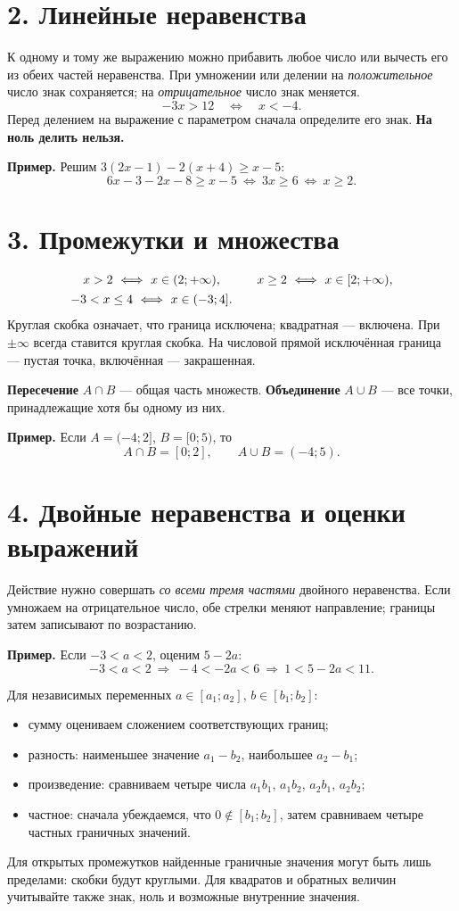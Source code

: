 \documentclass[a4paper,12pt]{article}
\newcommand{\chap}[1]{\needspace{7\baselineskip}\section*{\color{darkaccent}#1}}
\newcommand{\ex}[1]{\par\smallskip\textcolor{darkaccent}{\textbf{Пример.}} #1\par}
\newcommand{\key}[1]{\textcolor{darkaccent}{\textbf{#1}}}
\begin{document}
\chap{2. Линейные неравенства}
К одному и тому же выражению можно прибавить любое число или вычесть его из обеих частей неравенства. При умножении или делении на \emph{положительное} число знак сохраняется; на \emph{отрицательное} число знак меняется.
\[
-3x>12\quad\Longleftrightarrow\quad x<-4.
\]
Перед делением на выражение с параметром сначала определите его знак. \key{На ноль делить нельзя.}

\ex{Решим $3(2x-1)-2(x+4)\ge x-5$:
\[
6x-3-2x-8\ge x-5\ \Longleftrightarrow\ 3x\ge6
\ \Longleftrightarrow\ x\ge2.
\]}

\chap{3. Промежутки и множества}
\[
\begin{array}{c@{\qquad}c}
x>2\ \Longleftrightarrow\ x\in(2;+\infty), &
x\ge2\ \Longleftrightarrow\ x\in[2;+\infty),\\[4pt]
-3<x\le4\ \Longleftrightarrow\ x\in(-3;4]. &
\end{array}
\]
Круглая скобка означает, что граница исключена; квадратная --- включена. При $\pm\infty$ всегда ставится круглая скобка. На числовой прямой исключённая граница --- пустая точка, включённая --- закрашенная.

\key{Пересечение} $A\cap B$ --- общая часть множеств. \key{Объединение} $A\cup B$ --- все точки, принадлежащие хотя бы одному из них.

\ex{Если $A=(-4;2]$, $B=[0;5)$, то
\[
A\cap B=[0;2],\qquad A\cup B=(-4;5).
\]}
\clearpage

\chap{4. Двойные неравенства и оценки выражений}
Действие нужно совершать \emph{со всеми тремя частями} двойного неравенства. Если умножаем на отрицательное число, обе стрелки меняют направление; границы затем записывают по возрастанию.

\ex{Если $-3<a<2$, оценим $5-2a$:
\[
-3<a<2\ \Longrightarrow\ -4<-2a<6
\ \Longrightarrow\ \boxed{1<5-2a<11}.
\]}

Для независимых переменных $a\in[a_1;a_2]$, $b\in[b_1;b_2]$:
\begin{itemize}
\item сумму оцениваем сложением соответствующих границ;
\item разность: наименьшее значение $a_1-b_2$, наибольшее $a_2-b_1$;
\item произведение: сравниваем четыре числа $a_1b_1$, $a_1b_2$, $a_2b_1$, $a_2b_2$;
\item частное: сначала убеждаемся, что $0\notin[b_1;b_2]$, затем сравниваем четыре частных граничных значений.
\end{itemize}
Для открытых промежутков найденные граничные значения могут быть лишь пределами: скобки будут круглыми. Для квадратов и обратных величин учитывайте также знак, ноль и возможные внутренние значения.
\end{document}
